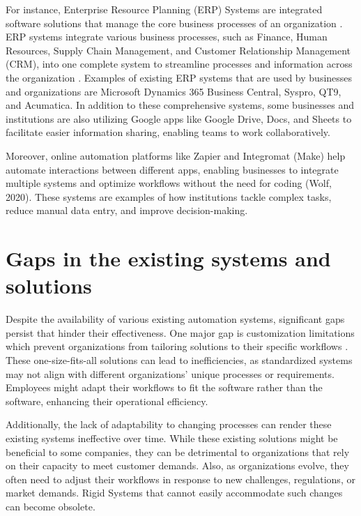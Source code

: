 For instance, Enterprise Resource Planning (ERP) Systems are integrated software solutions that manage the core business processes of an organization \cite{blahusiakova2023}. ERP systems integrate various business processes, such as Finance, Human Resources, Supply Chain Management, and Customer Relationship Management (CRM), into one complete system to streamline processes and information across the organization \cite{kimberling2024}. Examples of existing ERP systems that are used by businesses and organizations are Microsoft Dynamics 365 Business Central, Syspro, QT9, and Acumatica. In addition to these comprehensive systems, some businesses and institutions are also utilizing Google apps like Google Drive, Docs, and Sheets to facilitate easier information sharing, enabling teams to work collaboratively. 
 
Moreover, online automation platforms like Zapier and Integromat (Make) help automate interactions between different apps, enabling businesses to integrate multiple systems and optimize workflows without the need for coding (Wolf, 2020). These systems are examples of how institutions tackle complex tasks, reduce manual data entry, and improve decision-making.

\section{Gaps in the  existing systems and solutions}

Despite the availability of various existing automation systems, significant gaps persist that hinder their effectiveness. One major gap is customization limitations which prevent organizations from tailoring solutions to their specific workflows \cite{aleixo2010}. These one-size-fits-all solutions can lead to inefficiencies, as standardized systems may not align with different organizations' unique processes or requirements. Employees might adapt their workflows to fit the software rather than the software, enhancing their operational efficiency. 

Additionally, the lack of adaptability to changing processes can render these existing systems ineffective over time. While these existing solutions might be beneficial to some companies, they can be detrimental to organizations that rely on their capacity to meet customer demands\cite{akkermans2003}. Also, as organizations evolve, they often need to adjust their workflows in response to new challenges, regulations, or market demands. Rigid Systems that cannot easily accommodate such changes can become obsolete. 

